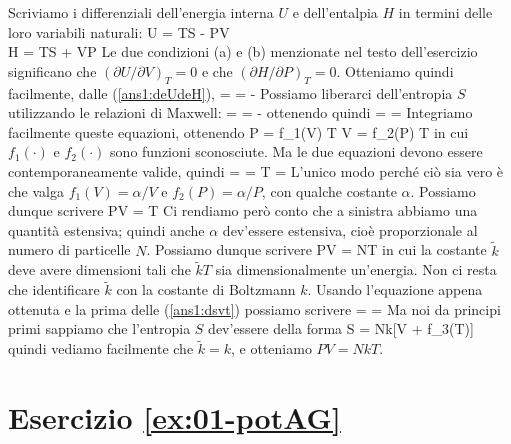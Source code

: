 Scriviamo i differenziali dell'energia interna $U$ e dell'entalpia $H$ in termini delle loro variabili naturali:
\bea
\label{ans1:deUdeH}
\de U = T\de S - P\de V \nonumber \\
\de H = T\de S + V\de P
\eea
Le due condizioni (a) e (b) menzionate nel testo dell'esercizio significano che $(\partial U/\partial V)_T = 0$ e che $(\partial H/\partial P)_T = 0$. Otteniamo quindi facilmente, dalle (\ref{ans1:deUdeH}),
\be
\label{ans1:dsvt}
 =  \quad\quad\quad {} = -
\ee
Possiamo liberarci dell'entropia $S$ utilizzando le relazioni di Maxwell:
\be
{} =  \quad\quad\quad {} = -
\ee
ottenendo quindi
\be
{} =  \quad\quad\quad {} = 
\ee
Integriamo facilmente queste equazioni, ottenendo
\be
P = f_1(V) T \quad\quad\quad V = f_2(P) T
\ee
in cui $f_1(\cdot)$ e $f_2(\cdot)$ sono funzioni sconosciute. Ma le due equazioni devono essere contemporaneamente valide, quindi
\be
{} =  = T = 
\ee
L'unico modo perché ciò sia vero è che valga $f_1(V) = \alpha/V$ e $f_2(P) = \alpha/P$, con qualche costante $\alpha$. Possiamo dunque scrivere
\be
PV = \alpha T
\ee
Ci rendiamo però conto che a sinistra abbiamo una quantità estensiva; quindi anche $\alpha$ dev'essere estensiva, cioè proporzionale al numero di particelle $N$. Possiamo dunque scrivere
\be
PV = NT
\ee
in cui la costante $\tilde{k}$ deve avere dimensioni tali che $\tilde{k}T$ sia dimensionalmente un'energia. Non ci resta che identificare $\tilde{k}$ con la costante di Boltzmann $k$. Usando l'equazione appena ottenuta e la prima delle (\ref{ans1:dsvt}) possiamo scrivere
\be
{} =  = 
\ee
Ma noi da principi primi sappiamo che l'entropia $S$ dev'essere della forma
\be
S = Nk[\ln V + f_3(T)]
\ee
quindi vediamo facilmente che $\tilde{k} = k$, e otteniamo $PV = NkT$.

%
%
\section*{Esercizio \ref{ex:01-potAG}}

